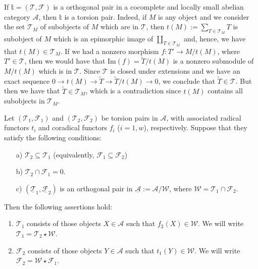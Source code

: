 If $\mathbb{t}=(\mathcal{T},\mathcal{F})$ is a orthogonal pair in a
cocomplete and locally small abelian category $\mathcal{A}$, then
$\mathbb{t}$ is a torsion pair. Indeed, if $M$ is any object and we
consider the set $\mathcal{T}_M$ of subobjects of $M$ which are in
$\mathcal{T}$, then $t(M):=\sum_{T\in\mathcal{T}_M}T$ is subobject of
$M$ which is an epimorphic image of $\coprod_{T\in\mathcal{T}_M}$ and,
hence, we have that $t(M)\in\mathcal{T}_M$. If we had a nonzero morphism
$f:T'\longrightarrow M/t(M)$, where $T'\in\mathcal{T}$, then we would
have that $\text{Im}(f)=\tilde{T}/t(M)$ is a nonzero submodule of
$M/t(M)$ which is in $\mathcal{T}$. Since $\mathcal{T}$ is closed under
extensions and we have an exact sequence $0\rightarrow
t(M)\longrightarrow\tilde{T}\longrightarrow \tilde{T}/t(M)\rightarrow
0$, we conclude that $\tilde{T}\in\mathcal{T}$. But then we have that
$\tilde{T}\in\mathcal{T}_M$, which is a contradiction since $t(M)$
contains all subobjects in $\mathcal{T}_M$.

\sepline

\begin{lemma}
  Let $(\mathcal{T}_1,\mathcal{F}_1)$ and
$(\mathcal{T}_2,\mathcal{F}_2)$ be torsion pairs in $\mathcal{A}$, with
associated radical functors $t_i$ and coradical functors $f_i$
($i=1,w$), respectively. Suppose that they satisfy the following conditions:
    \begin{enumerate}
    \item[a)] $\mathcal{T}_2\subseteq\mathcal{T}_1$ (equivalently,
$\mathcal{F}_1\subseteq\mathcal{F}_2$)
    \item[b)] $\mathcal{T}_2\cap\mathcal{F}_1=0$.
    \item[c)] $(\underline{\mathcal{T}}_1,\underline{\mathcal{F}}_2)$ is an orthogonal pair in $\underline{\mathcal{A}}:=\mathcal{A}/\mathcal{W}$,
where  $\mathcal{W}=\mathcal{T}_1\cap\mathcal{F}_2$.
    \end{enumerate}
    Then the
following assertions hold:

    \begin{enumerate}
    \item $\mathcal{T}_1$ consists of those objects $X\in\mathcal{A}$
such that $f_2(X)\in\mathcal{W}$. We will write
$\mathcal{T}_1=\mathcal{T}_2\star\mathcal{W}$.
    \item $\mathcal{F}_2$ consists of those objects $Y\in\mathcal{A}$
such that $t_1(Y)\in\mathcal{W}$. We will write
$\mathcal{F}_2=\mathcal{W}\star\mathcal{F}_1$.
    \end{enumerate}

\end{lemma}


